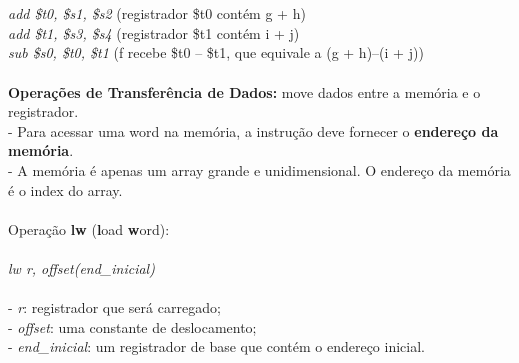 \documentclass[12pt]{article}
\begin{document}
    \\~\\\textit{add \$t0, \$s1, \$s2} (registrador \$t0 contém g + h)
    \\\textit{add \$t1, \$s3, \$s4} (registrador \$t1 contém i + j)
    \\\textit{sub \$s0, \$t0, \$t1} (f recebe \$t0 – \$t1, que equivale a (g + h)–(i + j))
    \\~\\\textbf{Operações de Transferência de Dados:} move dados entre a memória e o registrador.
    \\- Para acessar uma word na memória, a instrução deve fornecer o \textbf{endereço da memória}.
    \\- A memória é apenas um array grande e unidimensional. O endereço da memória é o index do array.
    \\~\\Operação \textbf{lw} (\textbf{l}oad \textbf{w}ord):
    \\~\\\textit{lw r, offset(end\_inicial)}
    \\~\\- \textit{r}: registrador que será carregado;
    \\- \textit{offset}: uma constante de deslocamento;
    \\- \textit{end\_inicial}: um registrador de base que contém o endereço inicial.
    

    
    

\end{document}

